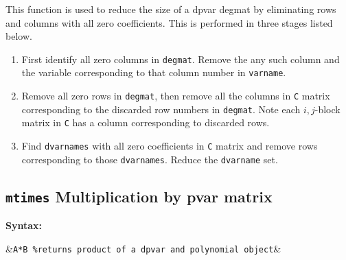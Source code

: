 \documentclass{article}
\begin{document}
	This function is used to reduce the size of a dpvar degmat by eliminating rows and columns with all zero coefficients. This is performed in three stages listed below.
	\begin{enumerate}
		\item First identify all zero columns in \texttt{degmat}. Remove the any such column and the variable corresponding to that column number in \texttt{varname}.
		\item Remove all zero rows in \texttt{degmat}, then remove all the columns in \texttt{C} matrix corresponding to the discarded row numbers in \texttt{degmat}. Note each $i,j$-block matrix in \texttt{C} has a column corresponding to discarded rows.
		\item Find \texttt{dvarnames} with all zero coefficients in \texttt{C} matrix and remove rows corresponding to those \texttt{dvarnames}. Reduce the \texttt{dvarname} set.
	\end{enumerate}
	
	\subsection{\texttt{mtimes} Multiplication by pvar matrix}
	
	\textbf{Syntax:}
		\begin{flalign*}
			&\texttt{A*B \%returns product of a dpvar and polynomial object}&
		\end{flalign*}
	
\end{document}
